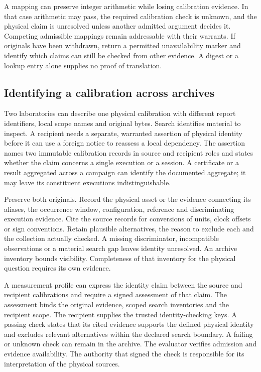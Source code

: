 \documentclass[11pt,a4paper]{article}
\newcommand{\topic}[1]{\par\smallskip{\sffamily\bfseries\color{ink}#1\par}\nobreak}
\begin{document}
A mapping can preserve integer arithmetic while losing calibration evidence. In that case arithmetic may pass, the required calibration check is unknown, and the physical claim is unresolved unless another admitted argument decides it. Competing admissible mappings remain addressable with their warrants. If originals have been withdrawn, return a permitted unavailability marker and identify which claims can still be checked from other evidence. A digest or a lookup entry alone supplies no proof of translation.

\clearpage
{}
\subsection*{Identifying a calibration across archives}\label{sec:calibrationidentity}
Two laboratories can describe one physical calibration with different report identifiers, local scope names and original bytes. Search identifies material to inspect. A recipient needs a separate, warranted assertion of physical identity before it can use a foreign notice to reassess a local dependency. The assertion names two immutable calibration records in source and recipient roles and states whether the claim concerns a single execution or a session. A certificate or a result aggregated across a campaign can identify the documented aggregate; it may leave its constituent executions indistinguishable.

\topic{Evidence and admission}
Preserve both originals. Record the physical asset or the evidence connecting its aliases, the occurrence window, configuration, reference and discriminating execution evidence. Cite the source records for conversions of units, clock offsets or sign conventions. Retain plausible alternatives, the reason to exclude each and the collection actually checked. A missing discriminator, incompatible observations or a material search gap leaves identity unresolved. An archive inventory bounds visibility. Completeness of that inventory for the physical question requires its own evidence.

A measurement profile can express the identity claim between the source and recipient calibrations and require a signed assessment of that claim. The assessment binds the original evidence, scoped search inventories and the recipient scope. The recipient supplies the trusted identity-checking keys. A passing check states that its cited evidence supports the defined physical identity and excludes relevant alternatives within the declared search boundary. A failing or unknown check can remain in the archive. The evaluator verifies admission and evidence availability. The authority that signed the check is responsible for its interpretation of the physical sources.
\end{document}
